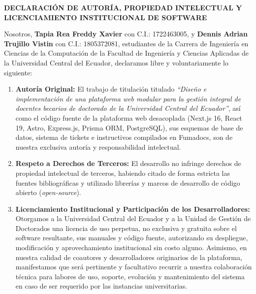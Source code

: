 
\pagestyle{empty}
\onehalfspacing
\fontsize{12}{18}\selectfont

\begin{center}
    \textbf{\Large DECLARACIÓN DE AUTORÍA, PROPIEDAD INTELECTUAL Y LICENCIAMIENTO INSTITUCIONAL DE SOFTWARE}
\end{center}

\vspace{0.6cm}

Nosotros, \textbf{Tapia Rea Freddy Xavier} con C.I.: 1722463005, y \textbf{Dennis Adrian Trujillo Vistin} con C.I.: 1805372081, estudiantes de la Carrera de Ingeniería en Ciencias de la Computación de la Facultad de Ingeniería y Ciencias Aplicadas de la Universidad Central del Ecuador, declaramos libre y voluntariamente lo siguiente:

\begin{enumerate}[label=\textbf{\arabic*.-},leftmargin=*]
    \item \textbf{Autoría Original:} El trabajo de titulación titulado \textit{“Diseño e implementación de una plataforma web modular para la gestión integral de docentes becarios de doctorado de la Universidad Central del Ecuador”}, así como el código fuente de la plataforma web desacoplada (Next.js 16, React 19, Astro, Express.js, Prisma ORM, PostgreSQL), sus esquemas de base de datos, sistema de tickets e instructivos compilados en Fumadocs, son de nuestra exclusiva autoría y responsabilidad intelectual.
    \item \textbf{Respeto a Derechos de Terceros:} El desarrollo no infringe derechos de propiedad intelectual de terceros, habiendo citado de forma estricta las fuentes bibliográficas y utilizado librerías y marcos de desarrollo de código abierto (\textit{open-source}).
    \item \textbf{Licenciamiento Institucional y Participación de los Desarrolladores:} Otorgamos a la Universidad Central del Ecuador y a la Unidad de Gestión de Doctorados una licencia de uso perpetua, no exclusiva y gratuita sobre el software resultante, sus manuales y código fuente, autorizando su despliegue, modificación y aprovechamiento institucional sin costo alguno. Asimismo, en nuestra calidad de coautores y desarrolladores originarios de la plataforma, manifestamos que será pertinente y facultativo recurrir a nuestra colaboración técnica para labores de uso, soporte, evolución y mantenimiento del sistema en caso de ser requerido por las instancias universitarias.
\end{enumerate}

